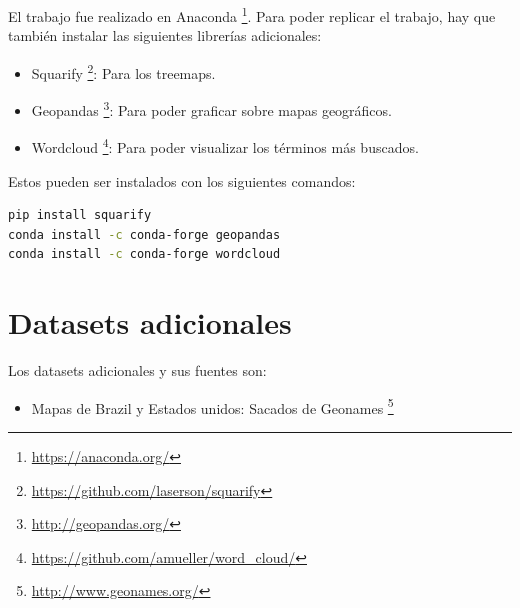 \documentclass[a4paper]{article}
\begin{document}
El trabajo fue realizado en Anaconda \footnote{\url{https://anaconda.org/}}. Para poder replicar el trabajo, hay que también instalar las siguientes librerías adicionales:

\begin{itemize}
\item{Squarify \footnote{\url{https://github.com/laserson/squarify}}: Para los treemaps.}
\item{Geopandas \footnote{\url{http://geopandas.org/}}: Para poder graficar sobre mapas geográficos.}
\item{Wordcloud \footnote{\url{https://github.com/amueller/word_cloud/}}: Para poder visualizar los términos más buscados.}
\end{itemize}

Estos pueden ser instalados con los siguientes comandos: 

\begin{lstlisting}[language=sh]
pip install squarify
conda install -c conda-forge geopandas
conda install -c conda-forge wordcloud
\end{lstlisting}

\section{Datasets adicionales}

Los datasets adicionales y sus fuentes son:

\begin{itemize}
\item{Mapas de Brazil y Estados unidos: Sacados de Geonames \footnote{\url{http://www.geonames.org/}} }
\end{itemize}

\newpage
\end{document}
